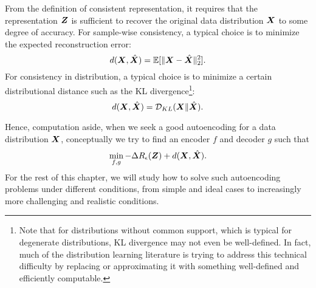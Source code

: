 \documentclass[\toplevelprefix/book-main.tex]{subfiles}
\begin{document}
From the definition of consistent representation, it requires that
the representation $\bm{Z}$ is sufficient to recover the original data
distribution $\bm{X}$ to some degree of accuracy. For sample-wise
consistency, a typical choice is to minimize the expected reconstruction error:
\begin{equation}
  d(\bm{X}, \hat {\bm{X}}) = \mathbb{E}[\|\bm{X} - \hat{\bm{X}}\|_2^2].
\end{equation}
For consistency in distribution, a typical choice is to minimize a
certain distributional distance such as the KL
divergence\footnote{Note that for distributions without common
  support, which is typical for degenerate distributions, KL divergence
  may not even be well-defined. In fact, much of the distribution
  learning literature is trying to address this technical difficulty by
  replacing or approximating it with something well-defined and
efficiently computable.}:
\begin{equation}
  d(\bm{X}, \hat {\bm{X}}) = \mathcal{D}_{KL}(\bm{X}\|\hat{\bm{X}}).
\end{equation}

Hence, computation aside, when we seek a good autoencoding for a data
distribution $\bm{X}$,  conceptually we try to find an encoder $f$ and
decoder $g$ such that
\begin{equation}
  \min_{f, g} - \Delta R_{\epsilon}(\bm{Z}) + d(\bm{X}, \hat {\bm{X}}).
  \label{eqn:autoencode-objective-ch5}
\end{equation}
For the rest of this chapter, we will study how to solve such
autoencoding problems under different conditions, from simple and
ideal cases to increasingly more challenging and realistic conditions.

\end{document}
